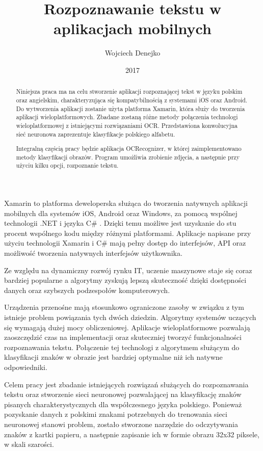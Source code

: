 \documentclass[brudnopis]{xmgr}
\author   {Wojciech Denejko}
\title    {Rozpoznawanie tekstu w aplikacjach mobilnych}
\date     {2017}
\begin{document}
\begin{abstract}
  Niniejsza praca ma na celu stworzenie aplikacji rozpoznającej tekst w języku polskim oraz angielskim, charakteryzująca się kompatybilnością z systemami iOS oraz Android. Do wytworzenia aplikacji zostanie użyta platforma Xamarin, która służy do tworzenia aplikacji wieloplatformowych. Zbadane zostaną różne metody połączenia technologi wieloplatformowej z istniejącymi rozwiązaniami OCR. Przedstawiona konwolucyjna sieć neuronowa zaprezentuje klasyfikacje polskiego alfabetu.
  
  Integralną częścią pracy będzie aplikacja OCRecognizer, w której zaimplementowano metody klasyfikacji obrazów. Program umożliwia zrobienie zdjęcia, a następnie przy użyciu kilku opcji, rozpoznanie tekstu.
  
\end{abstract}


\maketitle

\introduction

	Xamarin to platforma deweloperska służąca do tworzenia natywnych aplikacji mobilnych dla systemów iOS, Android oraz Windows, za pomocą wspólnej technologii .NET i języka C\# . Dzięki temu możliwe jest uzyskanie do stu procent wspólnego kodu między różnymi platformami. Aplikacje napisane przy użyciu technologii Xamarin i C\# mają pełny dostęp do interfejsów, API oraz możliwość tworzenia natywnych interfejsów użytkownika.
  
  Ze względu na dynamiczny rozwój rynku IT, uczenie maszynowe staje się coraz bardziej popularne a algorytmy zyskują lepszą skuteczność dzięki dostępności danych oraz szybszych podzespołów komputerowych. 
  
  Urządzenia przenośne mają stosunkowo ograniczone zasoby w związku z tym istnieje problem powiązania tych dwóch dziedzin. Algorytmy systemów uczących się wymagają dużej mocy obliczeniowej. Aplikacje wieloplatformowe pozwalają zaoszczędzić czas na implementacji oraz skuteczniej tworzyć funkcjonalności rozpoznawania tekstu. Połączenie tej technologi z algorytmem służącym do klasyfikacji znaków w obrazie jest bardziej optymalne niż ich natywne odpowiedniki.
  
  Celem pracy jest  zbadanie istniejących rozwiązań służących do rozpoznawania tekstu oraz stworzenie sieci neuronowej pozwalającej na klasyfikację znaków pisanych charakterystycznych dla współczesnego języka polskiego. Ponieważ pozyskanie danych z polskimi znakami potrzebnych do trenowania sieci neuronowej stanowi problem, zostało stworzone narzędzie do odczytywania znaków z kartki papieru, a następnie zapisanie ich w formie obrazu 32x32 piksele, w skali szarości.
\end{document}
